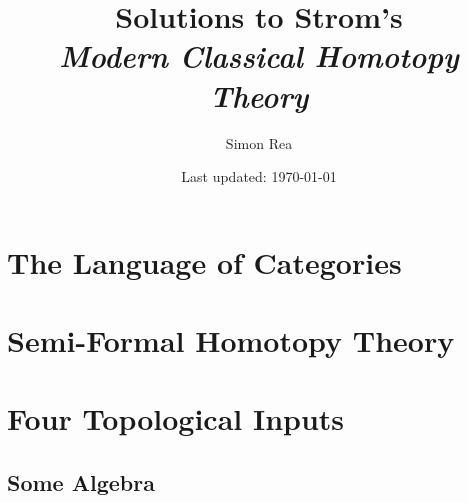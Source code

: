 \documentclass[12pt,twoside]{book}
\title{Solutions to Strom's\\\textit{Modern Classical Homotopy Theory}}
\author{Simon Rea}
\date{Last updated: \today}
\theoremstyle{definition}
\theoremstyle{remark}
\begin{document}
\maketitle
\tableofcontents

\part{The Language of Categories}



\part{Semi-Formal Homotopy Theory}



\part{Four Topological Inputs}


\appendix
\chapter{Some Algebra}

\end{document}
